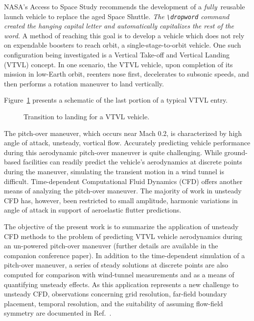 \documentclass[cover]{aiaa}%
\begin{document}
\dropword NASA's Access to Space Study\cite{bekey:94ja}
recommends the development of a {\em fully}\ reusable launch
vehicle\cite{dornheim:94awst} to replace the aged Space
Shuttle. {\em The \verb+\dropword+ command created the hanging
capital letter and automatically capitalizes the rest of the
word.}  A method of reaching this goal is to develop a vehicle
which does not rely on expendable boosters to reach orbit, a
single-stage-to-orbit vehicle\cite{austin:94ja}.  One such
configuration being investigated is a Vertical Take-off and
Vertical Landing (VTVL) concept\cite{austin:94ja}.  In one
scenario, the VTVL vehicle, upon completion of its mission in
low-Earth orbit, reenters nose first, decelerates to subsonic
speeds, and then performs a rotation
maneuver\cite{dornheim:95awst,david:95sn,dornheim:95awst2} to
land vertically.


Figure~\ref{f:trn2lndg} presents a schematic of the last portion
of a typical VTVL entry.
\begin{figure}
  \caption{Transition to landing for a VTVL vehicle.}
  \label{f:trn2lndg}
\end{figure}
The pitch-over maneuver, which occurs near Mach 0.2, is
characterized by high angle of attack, unsteady, vortical flow.
Accurately predicting vehicle performance during this aerodynamic
pitch-over maneuver is quite challenging. While ground-based
facilities can readily predict the vehicle's aerodynamics at
discrete points during the maneuver, simulating the transient
motion in a wind tunnel is difficult.\cite{oleary:94cp}
Time-dependent Computational Fluid Dynamics (CFD) offers another
means of analyzing the pitch-over maneuver. The majority of work
in unsteady CFD has, however, been restricted to small amplitude,
harmonic variations in angle of attack in support of aeroelastic
flutter predictions.\cite{edwards:92cp}

The objective of the present work is to summarize the application
of unsteady CFD methods to the problem of predicting VTVL vehicle
aerodynamics during an un-powered pitch-over maneuver (further
details are available in the companion conference
paper\cite{kleb:96cp}).  In addition to the time-dependent
simulation of a pitch-over maneuver, a series of steady solutions
at discrete points are also computed for comparison with
wind-tunnel measurements and as a means of quantifying unsteady
effects.  As this application represents a new challenge to
unsteady CFD, observations concerning grid resolution, far-field
boundary placement, temporal resolution, and the suitability of
assuming flow-field symmetry are documented in
Ref.~.
\end{document}
